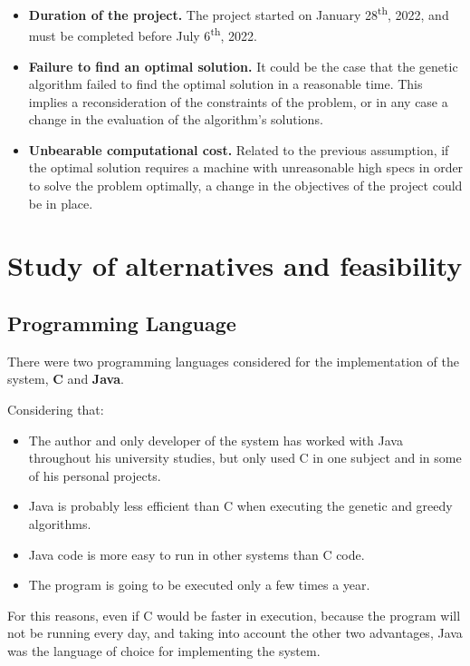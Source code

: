 \begin{itemize}
    \item \textbf{Duration of the project.} The project started on January 28\textsuperscript{th}, 2022, and must be completed before July 6\textsuperscript{th}, 2022. 
    \item \textbf{Failure to find an optimal solution.} It could be the case that the genetic algorithm failed to find the optimal solution in a reasonable time. This implies a reconsideration of the constraints of the problem, or in any case a change in the evaluation of the algorithm's solutions.
    \item \textbf{Unbearable computational cost.} Related to the previous assumption, if the optimal solution requires a machine with unreasonable high specs in order to solve the problem optimally, a change in the objectives of the project could be in place.
\end{itemize}

\section{Study of alternatives and feasibility}

\subsection{Programming Language}

There were two programming languages considered for the implementation of the system, \textbf{C} and \textbf{Java}.

Considering that:

\begin{itemize}
    \item The author and only developer of the system has worked with Java throughout his university studies, but only used C in one subject and in some of his personal projects.

    \item Java is probably less efficient than C when executing the genetic and greedy algorithms.

    \item Java code is more easy to run in other systems than C code.

    \item The program is going to be executed only a few times a year.
\end{itemize}

For this reasons, even if C would be faster in execution, because the program will not be running every day, and taking into account the other two advantages, Java was the language of choice for implementing the system.

